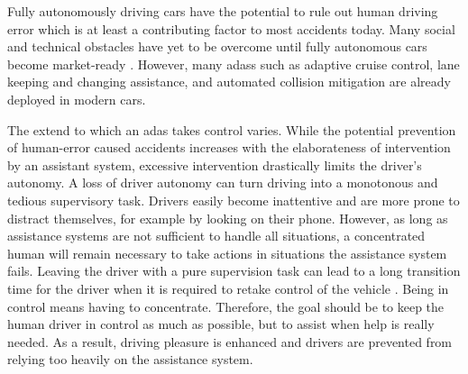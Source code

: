 \fi

%
%

Fully autonomously driving cars have the potential to rule out human driving error which is at least a contributing factor to most accidents today. Many social and technical obstacles have yet to be overcome until fully autonomous cars become market-ready \parencite{autonomous_driving_book}. However, many \glspl{adas} such as adaptive cruise control, lane keeping and changing assistance, and automated collision mitigation are already deployed in modern cars. 

The extend to which an \gls{adas} takes control varies. While the potential prevention of human-error caused accidents increases with the elaborateness of intervention by an assistant system, excessive intervention drastically limits the driver's autonomy. A loss of driver autonomy can turn driving into a monotonous and tedious supervisory task. Drivers easily become inattentive and are more prone to distract themselves, for example by looking on their phone. However, as long as assistance systems are not sufficient to handle all situations, a concentrated human will remain necessary to take actions in situations the assistance system fails. Leaving the driver with a pure supervision task can lead to a long transition time for the driver when it is required to retake control of the vehicle \parencite{shared_control}. Being in control means having to concentrate. Therefore, the goal should be to keep the human driver in control as much as possible, but to assist when help is really needed. As a result, driving pleasure is enhanced and drivers are prevented from relying too heavily on the assistance system.




